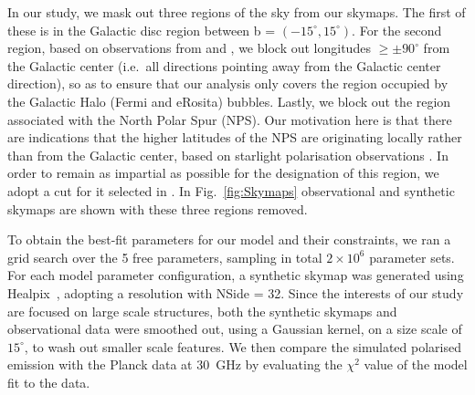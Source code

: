 \documentclass[usenatbib]{mnras}
\begin{document}
In our study, we mask out three regions of the sky from our skymaps. The first of these is in the Galactic disc region between b = $(-15^{\circ},15^{\circ})$. For the second region, based on observations from \cite{Su_2010} and \cite{eROSITA}, we block out longitudes  $\geq \pm 90^{\circ}$ from the Galactic center (i.e.~all directions pointing away from the Galactic center direction), so as to ensure that our analysis only covers the region occupied by the Galactic Halo (Fermi and eRosita) bubbles. Lastly, we block out the region associated with the North Polar Spur (NPS). Our motivation here is that there are indications that the higher latitudes of the NPS are originating locally rather than from the Galactic center, based on starlight polarisation observations \citep{Gina_2021}. In order to remain as impartial as possible for the designation of this region, we adopt a cut for it selected in \cite{Wolleben_2007}. In Fig.~\ref{fig:Skymaps} observational and synthetic skymaps are shown with these three regions removed.


To obtain the best-fit parameters for our model and their constraints, we ran a grid search over the 5 free parameters, sampling in total $2\times 10^{6}$ parameter sets. For each model parameter configuration, a synthetic skymap was generated using Healpix~\citep{Healpix_2005}, adopting a resolution with NSide = 32. Since the interests of our study are focused on large scale structures, both the synthetic skymaps and observational data were smoothed out, using a Gaussian kernel, on a size scale of $15^{\circ}$, to wash out smaller scale features. We then compare the simulated polarised emission with the Planck data at 30~GHz by evaluating the $\chi^{2}$ value of the model fit to the data. %
\end{document}
